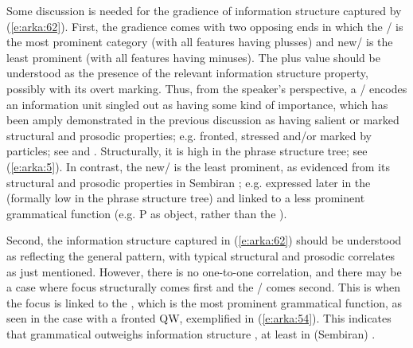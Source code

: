 \documentclass[output=paper
,modfonts
,nonflat]{langsci/langscibook}
\begin{document}
Some discussion is needed for the gradience of information structure  captured by (\ref{e:arka:62}). First, the gradience comes with two opposing ends in which the / is the most prominent category (with all features having plusses) and new/ is the least prominent (with all features having minuses). The plus value should be understood as the presence of the relevant information structure property, possibly with its overt marking. Thus, from the speaker’s perspective, a / encodes an information unit singled out as having some kind of importance, which has been amply demonstrated in the previous discussion as having salient or marked structural and prosodic properties; e.g. fronted, stressed and/or marked by particles; see  and . Structurally, it is high in the phrase structure tree; see (\ref{e:arka:5}). In contrast, the new/ is the least prominent, as evidenced from its structural and prosodic properties in Sembiran ; e.g. expressed later in the  (formally low in the phrase structure tree) and linked to a less prominent grammatical function (e.g. P as object, rather than the ).

Second, the information structure  captured in (\ref{e:arka:62}) should be understood as reflecting the general pattern, with typical structural and prosodic correlates as just mentioned. However, there is no one-to-one correlation, and there may be a case where focus structurally comes first and the / comes second. This is when the focus is linked to the , which is the most prominent grammatical function, as seen in the case with a fronted QW, exemplified in (\ref{e:arka:54}). This indicates that grammatical  outweighs information structure , at least in (Sembiran) .
\end{document}
